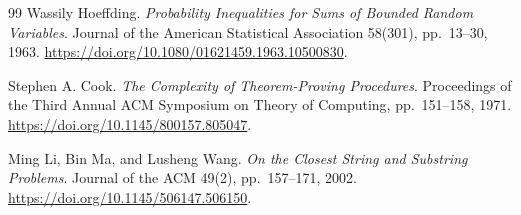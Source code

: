 \documentclass[11pt,a4paper]{article}
\theoremstyle{remark}
\newcommand{\1}{\mathbf 1}
\begin{document}
\begin{thebibliography}{99}
Wassily Hoeffding.
\emph{Probability Inequalities for Sums of Bounded Random Variables}.
Journal of the American Statistical Association 58(301), pp.~13--30, 1963.
\url{https://doi.org/10.1080/01621459.1963.10500830}.

Stephen A. Cook.
\emph{The Complexity of Theorem-Proving Procedures}.
Proceedings of the Third Annual ACM Symposium on Theory of Computing,
pp.~151--158, 1971.
\url{https://doi.org/10.1145/800157.805047}.

Ming Li, Bin Ma, and Lusheng Wang.
\emph{On the Closest String and Substring Problems}.
Journal of the ACM 49(2), pp.~157--171, 2002.
\url{https://doi.org/10.1145/506147.506150}.
\end{thebibliography}
\end{document}
